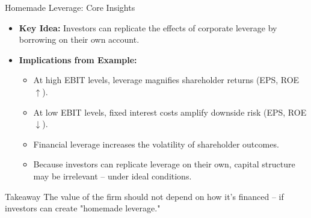 \begin{frame}{Homemade Leverage: Core Insights}
	
	\begin{itemize}
		\item \textbf{Key Idea:}  
		Investors can replicate the effects of corporate leverage by borrowing on their own account.
		
		\item \textbf{Implications from Example:}
		\begin{itemize}
			\item At high EBIT levels, leverage magnifies shareholder returns (EPS, ROE $\uparrow$).
			\item At low EBIT levels, fixed interest costs amplify downside risk (EPS, ROE $\downarrow$).
			\item Financial leverage increases the volatility of shareholder outcomes.
			\item Because investors can replicate leverage on their own, capital structure may be irrelevant -- under ideal conditions.
		\end{itemize}
	\end{itemize}
	
	\vspace{0.2cm}
	\begin{alertblock}{Takeaway}
		The value of the firm should not depend on how it's financed -- if investors can create "homemade leverage."
	\end{alertblock}
	
\end{frame}


